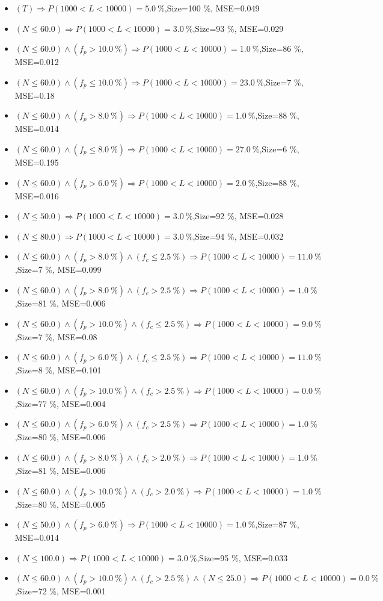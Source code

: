 \documentclass[numbered]{CSL}
\begin{document}
\begin{itemize}
\item $(T) \Rightarrow P(1 000 < L < 10 000) = 5.0~\%$,\hfill Size=100 \%, MSE=0.049
\item $(N \leq 60.0) \Rightarrow P(1 000 < L < 10 000) = 3.0~\%$,\hfill Size=93 \%, MSE=0.029
\item $(N \leq 60.0) \land (f_p > 10.0~\%) \Rightarrow P(1 000 < L < 10 000) = 1.0~\%$,\hfill Size=86 \%, MSE=0.012
\item $(N \leq 60.0) \land (f_p \leq 10.0~\%) \Rightarrow P(1 000 < L < 10 000) = 23.0~\%$,\hfill Size=7 \%, MSE=0.18
\item $(N \leq 60.0) \land (f_p > 8.0~\%) \Rightarrow P(1 000 < L < 10 000) = 1.0~\%$,\hfill Size=88 \%, MSE=0.014
\item $(N \leq 60.0) \land (f_p \leq 8.0~\%) \Rightarrow P(1 000 < L < 10 000) = 27.0~\%$,\hfill Size=6 \%, MSE=0.195
\item $(N \leq 60.0) \land (f_p > 6.0~\%) \Rightarrow P(1 000 < L < 10 000) = 2.0~\%$,\hfill Size=88 \%, MSE=0.016
\item $(N \leq 50.0) \Rightarrow P(1 000 < L < 10 000) = 3.0~\%$,\hfill Size=92 \%, MSE=0.028
\item $(N \leq 80.0) \Rightarrow P(1 000 < L < 10 000) = 3.0~\%$,\hfill Size=94 \%, MSE=0.032
\item $(N \leq 60.0) \land (f_p > 8.0~\%) \land (f_c \leq 2.5~\%) \Rightarrow P(1 000 < L < 10 000) = 11.0~\%$,\hfill Size=7 \%, MSE=0.099
\item $(N \leq 60.0) \land (f_p > 8.0~\%) \land (f_c > 2.5~\%) \Rightarrow P(1 000 < L < 10 000) = 1.0~\%$,\hfill Size=81 \%, MSE=0.006
\item $(N \leq 60.0) \land (f_p > 10.0~\%) \land (f_c \leq 2.5~\%) \Rightarrow P(1 000 < L < 10 000) = 9.0~\%$,\hfill Size=7 \%, MSE=0.08
\item $(N \leq 60.0) \land (f_p > 6.0~\%) \land (f_c \leq 2.5~\%) \Rightarrow P(1 000 < L < 10 000) = 11.0~\%$,\hfill Size=8 \%, MSE=0.101
\item $(N \leq 60.0) \land (f_p > 10.0~\%) \land (f_c > 2.5~\%) \Rightarrow P(1 000 < L < 10 000) = 0.0~\%$,\hfill Size=77 \%, MSE=0.004
\item $(N \leq 60.0) \land (f_p > 6.0~\%) \land (f_c > 2.5~\%) \Rightarrow P(1 000 < L < 10 000) = 1.0~\%$,\hfill Size=80 \%, MSE=0.006
\item $(N \leq 60.0) \land (f_p > 8.0~\%) \land (f_c > 2.0~\%) \Rightarrow P(1 000 < L < 10 000) = 1.0~\%$,\hfill Size=81 \%, MSE=0.006
\item $(N \leq 60.0) \land (f_p > 10.0~\%) \land (f_c > 2.0~\%) \Rightarrow P(1 000 < L < 10 000) = 1.0~\%$,\hfill Size=80 \%, MSE=0.005
\item $(N \leq 50.0) \land (f_p > 6.0~\%) \Rightarrow P(1 000 < L < 10 000) = 1.0~\%$,\hfill Size=87 \%, MSE=0.014
\item $(N \leq 100.0) \Rightarrow P(1 000 < L < 10 000) = 3.0~\%$,\hfill Size=95 \%, MSE=0.033
\item $(N \leq 60.0) \land (f_p > 10.0~\%) \land (f_c > 2.5~\%) \land (N \leq 25.0) \Rightarrow P(1 000 < L < 10 000) = 0.0~\%$,\hfill Size=72 \%, MSE=0.001
\end{itemize}
\end{document}
